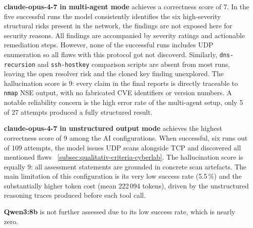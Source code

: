 \textbf{claude-opus-4-7 in multi-agent mode} achieves a correctness score of 7.
In the five successful runs the model consistently identifies the six high-severity structural
risks present in the network, the findings are not exposed here for security reasons.
All findings are accompanied by severity ratings and actionable remediation steps.
However, none of the successful runs includes \acrshort{UDP} enumeration so all flaws with this protocol got not discoverd.
Similarly, \texttt{dns-recursion} and \texttt{ssh-hostkey} comparison scripts are absent from
most runs, leaving the open resolver risk and the cloned key finding unexplored.
The hallucination score is 9: every claim in the final reports is directly traceable to
\texttt{nmap} \acrshort{NSE} output, with no fabricated CVE identifiers or version numbers.
A notable reliability concern is the high error rate of the multi-agent setup,
only 5 of 27 attempts produced a fully structured result.

\textbf{claude-opus-4-7 in unstructured output mode} achieves the highest correctness score of
9 among the \acrshort{AI} configurations.
When successful, six runs out of 109 attempts,  the model issues \acrshort{UDP} scans
alongside \acrshort{TCP} and discovered all mentioned flaws ~\ref{subsec:qualitativ-criteria-cyberlab}.
The hallucination score is equally 9: all assessment statements are grounded in concrete scan
artefacts.
The main limitation of this configuration is its very low success rate (5.5\,\%) and the
substantially higher token cost (mean 222\,094 tokens), driven by the unstructured reasoning
traces produced before each tool call.

\textbf{Qwen3:8b} is not further assessed due to its low success rate, which is nearly zero.
